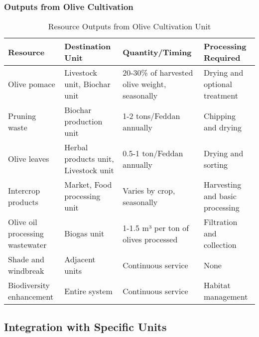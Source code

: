 \subsubsection{Outputs from Olive Cultivation}
\begin{table}[h]
\centering
\begin{tabular}{|p{3cm}|p{4cm}|p{4cm}|p{4cm}|}
\hline
\textbf{Resource} & \textbf{Destination Unit} & \textbf{Quantity/Timing} & \textbf{Processing Required} \\
\hline
Olive pomace & Livestock unit, Biochar unit & 20-30\% of harvested olive weight, seasonally & Drying and optional treatment \\
\hline
Pruning waste & Biochar production unit & 1-2 tons/Feddan annually & Chipping and drying \\
\hline
Olive leaves & Herbal products unit, Livestock unit & 0.5-1 ton/Feddan annually & Drying and sorting \\
\hline
Intercrop products & Market, Food processing unit & Varies by crop, seasonally & Harvesting and basic processing \\
\hline
Olive oil processing wastewater & Biogas unit & 1-1.5 m³ per ton of olives processed & Filtration and collection \\
\hline
Shade and windbreak & Adjacent units & Continuous service & None \\
\hline
Biodiversity enhancement & Entire system & Continuous service & Habitat management \\
\hline
\end{tabular}
\caption{Resource Outputs from Olive Cultivation Unit}
\end{table}

\subsection{Integration with Specific Units}

